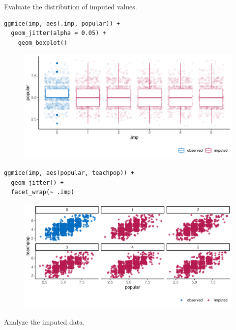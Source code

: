 \documentclass[
  article]{jss}
\begin{document}
Evaluate the distribution of imputed values.

\begin{verbatim}
ggmice(imp, aes(.imp, popular)) + 
  geom_jitter(alpha = 0.05) +
    geom_boxplot()
\end{verbatim}

\begin{figure}[t]

{\centering \includegraphics{manuscript_files/figure-pdf/unnamed-chunk-16-1.pdf}

}

\end{figure}

\begin{verbatim}
ggmice(imp, aes(popular, teachpop)) + 
  geom_jitter() +
  facet_wrap(~ .imp)
\end{verbatim}

\begin{figure}[t]

{\centering \includegraphics{manuscript_files/figure-pdf/unnamed-chunk-17-1.pdf}

}

\end{figure}

Analyze the imputed data.
\end{document}

